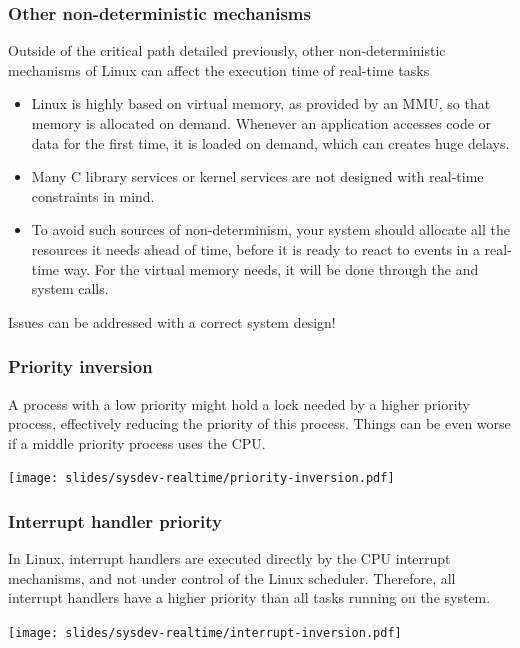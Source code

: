 \begin{frame}
  \frametitle{Other non-deterministic mechanisms}
  Outside of the critical path detailed previously, other
  non-deterministic mechanisms of Linux can affect the execution
  time of real-time tasks
  \begin{itemize}
  \item Linux is highly based on virtual memory, as provided by an
    MMU, so that memory is allocated on demand. Whenever an
    application accesses code or data for the first time, it is loaded
    on demand, which can creates huge delays.
  \item Many C library services or kernel services are not designed
    with real-time constraints in mind.
  \item To avoid such sources of non-determinism, your system should allocate
    all the resources it needs ahead of time, before it is ready to react
    to events in a real-time way. For the virtual memory needs, it will
    be done through the  and  system calls.
  \end{itemize}
  Issues can be addressed with a correct system design!
\end{frame}

\begin{frame}
  \frametitle{Priority inversion}

  A process with a low priority might hold a lock needed by a higher
  priority process, effectively reducing the priority of this
  process. Things can be even worse if a middle priority process uses
  the CPU.

  \begin{center}
    \texttt{[image: slides/sysdev-realtime/priority-inversion.pdf]}
  \end{center}
\end{frame}

\begin{frame}
  \frametitle{Interrupt handler priority}

  In Linux, interrupt handlers are executed directly by the CPU
  interrupt mechanisms, and not under control of the Linux
  scheduler. Therefore, all interrupt handlers have a higher priority
  than all tasks running on the system.

  \begin{center}
    \texttt{[image: slides/sysdev-realtime/interrupt-inversion.pdf]}
  \end{center}
\end{frame}

